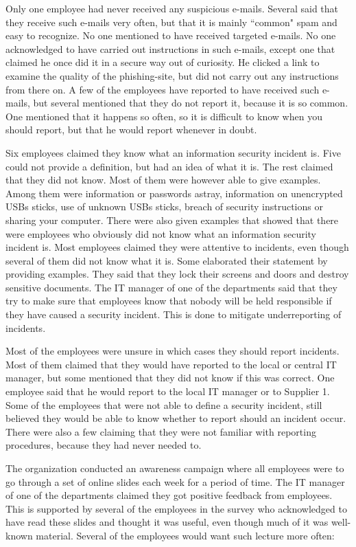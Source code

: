 \documentclass[b5paper, twoside, openright, 11pt]{report}
\begin{document}
Only one employee had never received any suspicious e-mails. Several said that they receive such e-mails very often, but that it is mainly ``common" spam and easy to recognize. No one mentioned to have received targeted e-mails. No one acknowledged to have carried out instructions in such e-mails, except one that claimed he once did it in a secure way out of curiosity. He clicked a link to examine the quality of the phishing-site, but did not carry out any instructions from there on. A few of the employees have reported to have received such e-mails, but several mentioned that they do not report it, because it is so common. One mentioned that it happens so often, so it is difficult to know when you should report, but that he would report whenever in doubt.

Six employees claimed they know what an information security incident is. Five could not provide a definition, but had an idea of what it is. The rest claimed that they did not know. Most of them were however able to give examples. Among them were information or passwords astray, information on unencrypted \acsp{USB} sticks, use of unknown \acsp{USB} sticks, breach of security instructions or sharing your computer. There were also given examples that showed that there were employees who obviously did not know what an information security incident is. Most employees claimed they were attentive to incidents, even though several of them did not know what it is. Some elaborated their statement by providing examples. They said that they lock their screens and doors and destroy sensitive documents. The IT manager of one of the departments said that they try to make sure that employees know that nobody will be held responsible if they have caused a security incident. This is done to mitigate underreporting of incidents.

Most of the employees were unsure in which cases they should report incidents. Most of them claimed that they would have reported to the local or central IT manager, but some mentioned that they did not know if this was correct. One employee said that he would report to the local IT manager or to Supplier 1. Some of the employees that were not able to define a security incident, still believed they would be able to know whether to report should an incident occur. There were also a few claiming that they were not familiar with reporting procedures, because they had never needed to.

The organization conducted an awareness campaign where all employees were to go through a set of online slides each week for a period of time. The IT manager of one of the departments claimed they got positive feedback from employees. This is supported by several of the employees in the survey who acknowledged to have read these slides and thought it was useful, even though much of it was well-known material. Several of the employees would want such lecture more often:
\end{document}
